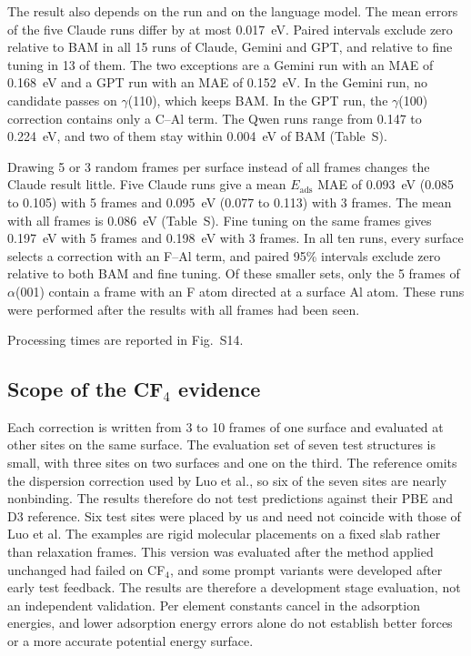 The result also depends on the run and on the language model. The mean errors of the five Claude runs differ by at most 0.017~eV. Paired intervals exclude zero relative to BAM in all 15 runs of Claude, Gemini and GPT, and relative to fine tuning in 13 of them. The two exceptions are a Gemini run with an MAE of 0.168~eV and a GPT run with an MAE of 0.152~eV. In the Gemini run, no candidate passes on $\gamma$(110), which keeps BAM. In the GPT run, the $\gamma$(100) correction contains only a C--Al term. The Qwen runs range from 0.147 to 0.224~eV, and two of them stay within 0.004~eV of BAM (Table~S\fi).

Drawing 5 or 3 random frames per surface instead of all frames changes the Claude result little. Five Claude runs give a mean $E_\mathrm{ads}$ MAE of 0.093~eV (0.085 to 0.105) with 5 frames and 0.095~eV (0.077 to 0.113) with 3 frames. The mean with all frames is 0.086~eV (Table~S\fi). Fine tuning on the same frames gives 0.197~eV with 5 frames and 0.198~eV with 3 frames. In all ten runs, every surface selects a correction with an F--Al term, and paired 95\% intervals exclude zero relative to both BAM and fine tuning. Of these smaller sets, only the 5 frames of $\alpha$(001) contain a frame with an F atom directed at a surface Al atom. These runs were performed after the results with all frames had been seen.

Processing times are reported in Fig.~S14.

\FloatBarrier
\subsection{Scope of the CF$_4$ evidence}

Each correction is written from 3 to 10 frames of one surface and evaluated at other sites on the same surface. The evaluation set of seven test structures is small, with three sites on two surfaces and one on the third. The reference omits the dispersion correction used by Luo et al., so six of the seven sites are nearly nonbinding. The results therefore do not test predictions against their PBE and D3 reference. Six test sites were placed by us and need not coincide with those of Luo et al. The examples are rigid molecular placements on a fixed slab rather than relaxation frames. This version was evaluated after the method applied unchanged had failed on CF$_4$, and some prompt variants were developed after early test feedback. The results are therefore a development stage evaluation, not an independent validation. Per element constants cancel in the adsorption energies, and lower adsorption energy errors alone do not establish better forces or a more accurate potential energy surface.

